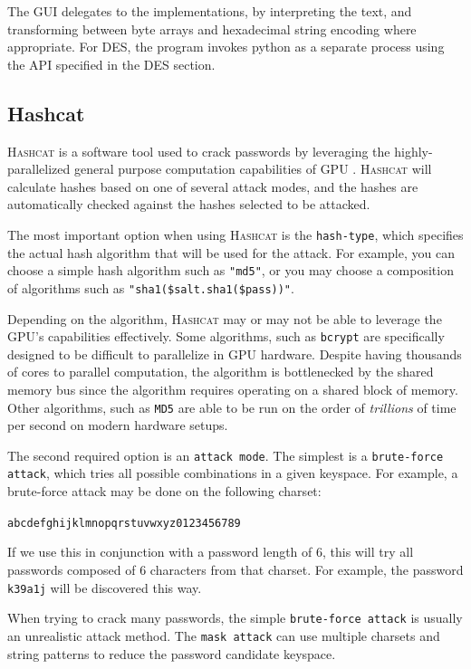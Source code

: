 \documentclass[acmlarge]{acmart}
\begin{document}
The GUI delegates to the implementations, by interpreting the text, and transforming between byte arrays and hexadecimal string encoding where appropriate. For DES, the program invokes python as a separate process using the API specified in the DES section.

\subsection{Hashcat}\label{sec:hashcat}

\textsc{Hashcat} is a software tool used to crack passwords by leveraging the highly-parallelized general purpose computation capabilities of GPU \cite{Hashcat}. \textsc{Hashcat} will calculate hashes based on one of several attack modes, and the hashes are automatically checked against the hashes selected to be attacked.

The most important option when using \textsc{Hashcat} is the \texttt{hash-type}, which specifies the actual hash algorithm that will be used for the attack. For example, you can choose a simple hash algorithm such as \texttt{"md5"}, or you may choose a composition of algorithms such as \texttt{"sha1(\$salt.sha1(\$pass))"}.

Depending on the algorithm, \textsc{Hashcat} may or may not be able to leverage the GPU's capabilities effectively. Some algorithms, such as \texttt{bcrypt} are specifically designed to be difficult to parallelize in GPU hardware. Despite having thousands of cores to parallel computation, the algorithm is bottlenecked by the shared memory bus since the algorithm requires operating on a shared block of memory. Other algorithms, such as \texttt{MD5} are able to be run on the order of \textit{trillions} of time per second on modern hardware setups.

The second required option is an \texttt{attack mode}. The simplest is a \texttt{brute-force attack}, which tries all possible combinations in a given keyspace. For example, a brute-force attack may be done on the following charset:

\begin{center}
\texttt{abcdefghijklmnopqrstuvwxyz0123456789}	
\end{center}

If we use this in conjunction with a password length of $6$, this will try all passwords composed of $6$ characters from that charset. For example, the password \texttt{k39a1j} will be discovered this way.

When trying to crack many passwords, the simple \texttt{brute-force attack} is usually an unrealistic attack method. The \texttt{mask attack} can use multiple charsets and string patterns to reduce the password candidate keyspace.
\end{document}
